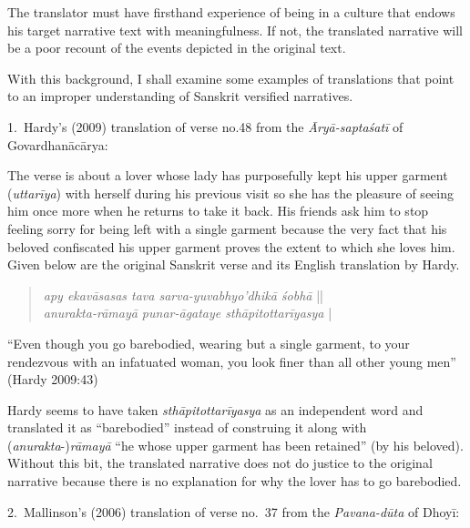 The translator must have firsthand experience of being in a culture that endows his target narrative text with meaningfulness. If not, the translated narrative will be a poor recount of the events depicted in the original text. 

With this background, I shall examine some examples of translations that point to an improper understanding of Sanskrit versified narratives.  


1.~Hardy’s (2009) translation of verse no.\@ 48 from the \textsl{Āryā-saptaśatī} of Govardhanācārya: 

The verse is about a lover whose lady has purposefully kept his upper garment (\textsl{uttarīya}) with herself during his previous visit so she has the pleasure of seeing him once more when he returns to take it back. His friends ask him to stop feeling sorry for being left with a single garment because the very fact that his beloved confiscated his upper garment proves the extent to which she loves him. Given below are the original Sanskrit verse and its English translation by Hardy. 
\begin{quote}
\textsl{apy ekavāsasas tava sarva-yuvabhyo’dhikā śobhā}  ||\\
\textsl{anurakta-rāmayā punar-āgataye sthāpitottarīyasya} |
\end{quote}

\begin{myquote}
“Even though you go barebodied, wearing but a single garment, to your rendezvous with an infatuated woman, you look finer than all other young men” 
\hfill(Hardy 2009:43)
\end{myquote}

Hardy seems to have taken \textsl{sthāpitottarīyasya }as an independent word and translated it as “barebodied” instead of construing it along with (\textsl{anurakta}-)\textsl{rāmayā}  “he whose upper garment has been retained” (by his beloved). Without this bit, the translated narrative does not do justice to the original narrative because there is no explanation for why the lover has to go barebodied.

2.~Mallinson’s (2006) translation of verse no.\ 37 from the \textsl{Pavana-dūta} of Dhoyī:  

